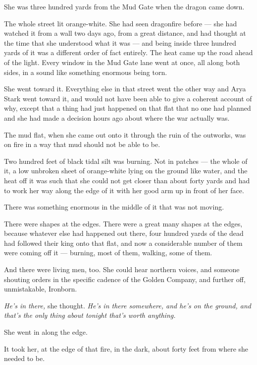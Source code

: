 \sceneBreak

She was three hundred yards from the Mud Gate when the dragon came down.

The whole street lit orange-white. She had seen dragonfire before — she had watched it from a wall two days ago, from a great distance, and had thought at the time that she understood what it was — and being inside three hundred yards of it was a different order of fact entirely. The heat came up the road ahead of the light. Every window in the Mud Gate lane went at once, all along both sides, in a sound like something enormous being torn.

She went toward it. Everything else in that street went the other way and Arya Stark went toward it, and would not have been able to give a coherent account of why, except that a thing had just happened on that flat that no one had planned and she had made a decision hours ago about where the war actually was.

\sceneBreak

The mud flat, when she came out onto it through the ruin of the outworks, was on fire in a way that mud should not be able to be.

Two hundred feet of black tidal silt was burning. Not in patches — the whole of it, a low unbroken sheet of orange-white lying on the ground like water, and the heat off it was such that she could not get closer than about forty yards and had to work her way along the edge of it with her good arm up in front of her face.

There was something enormous in the middle of it that was not moving.

There were shapes at the edges. There were a great many shapes at the edges, because whatever else had happened out there, four hundred yards of the dead had followed their king onto that flat, and now a considerable number of them were coming off it — burning, most of them, walking, some of them.

And there were living men, too. She could hear northern voices, and someone shouting orders in the specific cadence of the Golden Company, and further off, unmistakable, Ironborn.

\textit{He’s in there,} she thought. \textit{He’s in there somewhere, and he’s on the ground, and that’s the only thing about tonight that’s worth anything.}

She went in along the edge.

\sceneBreak

It took her, at the edge of that fire, in the dark, about forty feet from where she needed to be.


